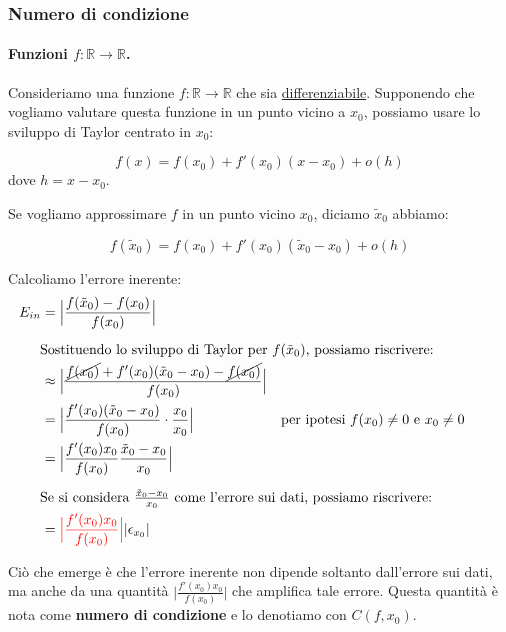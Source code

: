 \documentclass{article}
\numberwithin{equation}{section}
\newcommand{\alignedintertext}[1]{%
  \noalign{%
    \vskip\belowdisplayshortskip
    \vtop{\hsize=\linewidth#1\par
    \expandafter}%
    \expandafter\prevdepth\the\prevdepth
  }%
}
\begin{document}
\subsubsection{Numero di condizione}
\paragraph{Funzioni $f:\mathbb{R}\rightarrow \mathbb{R}$.}
Consideriamo una funzione $f:\mathbb{R}\rightarrow \mathbb{R}$ che sia
\underline{differenziabile}. Supponendo che vogliamo valutare questa funzione in un
punto vicino a $x_0$, possiamo usare lo sviluppo di Taylor centrato in
$x_0$:

$$f(x)=f(x_0)+f'(x_0)(x-x_0)+o(h)$$
dove $h=x-x_0$.

Se vogliamo approssimare $f$ in un punto vicino $x_0$, diciamo
$\tilde{x}_0$ abbiamo:

$$f(\tilde{x}_0)=f(x_0)+f'(x_0)(\tilde{x}_0-x_0)+o(h)$$

Calcoliamo l'errore inerente:
\begin{equation*}
    \begin{aligned}
        E_{in}&= \Big\lvert \frac{f(\tilde{x}_0)-f(x_0)}{f(x_0)}\Big\rvert \\
            \alignedintertext{Sostituendo lo sviluppo di Taylor per
            $f(\tilde{x}_0)$, possiamo riscrivere:}
            &\approx \Big\lvert
            \frac{\cancel{f(x_0)}+f'(x_0)(\tilde{x}_0-x_0)-\cancel{f(x_0)}}{f(x_0)}\Big\rvert\\
            &=\Big\lvert
            \frac{f'(x_0)(\tilde{x}_0-x_0)}{f(x_0)}\cdot \frac{x_0}{x_0}\Big\rvert & \text{per ipotesi }
            f(x_0)\neq0 \text{ e }x_0\neq0\\ 
            &= \Big\lvert
            \frac{f'(x_0)x_0}{f(x_0)}\frac{\tilde{x}_0-x_0}{x_0}\Big\rvert\\ 
            \alignedintertext{Se si considera
            $\frac{\tilde{x}_0-x_0}{x_0}$ come 
            l'errore sui dati, possiamo riscrivere:}
            &= {\color{red}\Big\lvert \frac{f'(x_0)x_0}{f(x_0)}\Big\rvert} \lvert
            \epsilon_{x_0}\rvert
    \end{aligned}
\end{equation*}

Ciò che emerge è che l'errore inerente non dipende soltanto dall'errore sui
dati, ma anche da una quantità $\Big\lvert \frac{f'(x_0)x_0}{f(x_0)}\Big\rvert$ che amplifica tale errore.
Questa quantità è nota come \textbf{numero di condizione} e lo denotiamo con
$C(f, x_0)$. 
\end{document}
